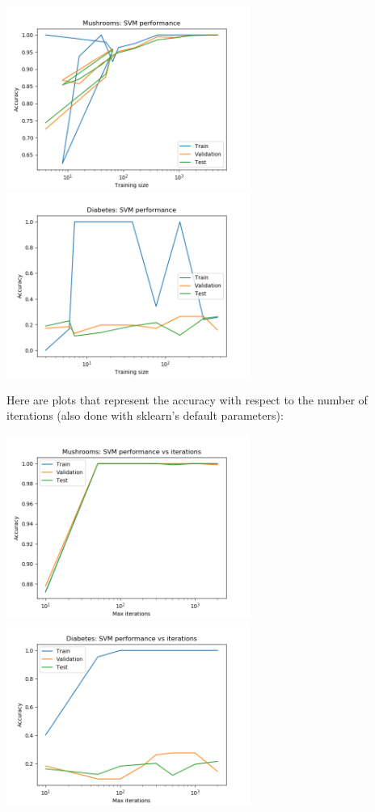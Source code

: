 \documentclass[11pt]{article}
\begin{document}
        \includegraphics[width=8cm]{mushrooms/mushroom_svm_trainingsize.png}
        \includegraphics[width=8cm]{diabetes/diabetes_svm_trainingsize.png}

        Here are plots that represent the accuracy with respect to the number of iterations (also done with sklearn's default parameters):

        \includegraphics[width=8cm]{mushrooms/mushroom_svm_iterations.png}
        \includegraphics[width=8cm]{diabetes/diabetes_svm_iterations.png}
\end{document}

